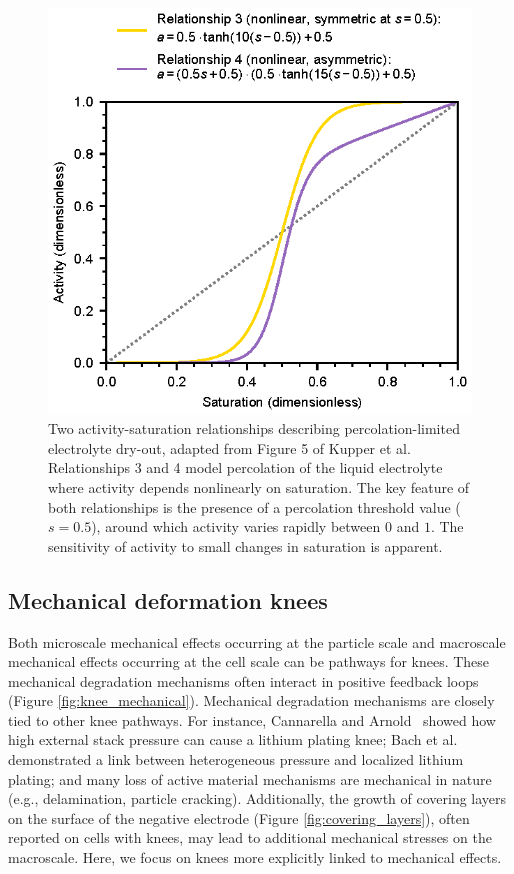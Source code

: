 \documentclass[journal=jpclcd,manuscript=article]{achemso}
\begin{document}
\begin{figure}[ht]
    \centering
    \includegraphics[scale=1.0]{figures/percolation.eps}
    \caption{Two activity-saturation relationships describing percolation-limited electrolyte dry-out, adapted from Figure 5 of Kupper et al.\cite{kupper_end--life_2018} Relationships 3 and 4 model percolation of the liquid electrolyte where activity depends nonlinearly on saturation. The key feature of both relationships is the presence of a percolation threshold value ($s=0.5$), around which activity varies rapidly between $0$ and $1$.
    The sensitivity of activity to small changes in saturation is apparent.}
    \label{fig:percolation}
\end{figure}

\subsection{Mechanical deformation knees}

Both microscale mechanical effects occurring at the particle scale and macroscale mechanical effects occurring at the cell scale can be pathways for knees.
These mechanical degradation mechanisms often interact in positive feedback loops (Figure \ref{fig:knee_mechanical}).
Mechanical degradation mechanisms are closely tied to other knee pathways. For instance, Cannarella and Arnold~\cite{cannarella_stress_2014} showed how high external stack pressure can cause a lithium plating knee; Bach et al.\cite{bach_nonlinear_2016} demonstrated a link between heterogeneous pressure and localized lithium plating; and many loss of active material mechanisms are mechanical in nature (e.g., delamination, particle cracking).
Additionally, the growth of covering layers on the surface of the negative electrode (Figure \ref{fig:covering_layers}), often reported on cells with knees, \cite{lewerenz_post-mortem_2017,willenberg_development_2020,stiaszny_electrochemical_2014} may lead to additional mechanical stresses on the macroscale.
Here, we focus on knees more explicitly linked to mechanical effects.
\end{document}

